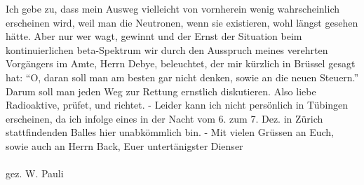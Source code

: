 Ich gebe zu, dass mein Ausweg vielleicht von vornherein wenig wahrscheinlich 
erscheinen wird, weil man die Neutronen, wenn sie existieren, wohl längst gesehen hätte. 
Aber nur wer wagt, gewinnt und der Ernst der Situation beim kontinuierlichen beta-Spektrum 
wir durch den Ausspruch meines verehrten Vorgängers im Amte, Herrn Debye, beleuchtet, der 
mir kürzlich in Brüssel gesagt hat: ``O, daran soll man am besten gar nicht denken, sowie 
an die neuen Steuern.'' Darum soll man jeden Weg zur Rettung ernstlich diskutieren. Also 
liebe Radioaktive, prüfet, und richtet. - Leider kann ich nicht persönlich in Tübingen 
erscheinen, da ich infolge eines in der Nacht vom 6. zum 7. Dez. in Zürich stattfindenden 
Balles hier unabkömmlich bin. - Mit vielen Grüssen an Euch, sowie auch an Herrn Back, 
Euer untertänigster Dienser \\ \\ 
gez. W. Pauli